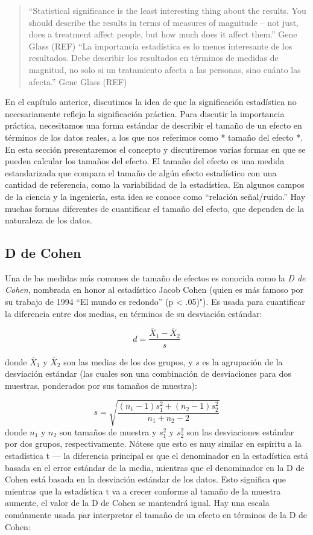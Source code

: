 \documentclass[
  12pt,
]{book}
\theoremstyle{definition}
\theoremstyle{definition}
\theoremstyle{definition}
\theoremstyle{remark}
\begin{document}
\begin{quote}
``Statistical significance is the least interesting thing about the results. You should describe the results in terms of measures of magnitude -- not just, does a treatment affect people, but how much does it affect them.'' Gene Glass (REF)
``La importancia estadística es lo menos interesante de los resultados. Debe describir los resultados en términos de medidas de magnitud, no solo si un tratamiento afecta a las personas, sino cuánto las afecta.'' Gene Glass (REF)
\end{quote}

En el capítulo anterior, discutimos la idea de que la significación estadística no necesariamente refleja la significación práctica. Para discutir la importancia práctica, necesitamos una forma estándar de describir el tamaño de un efecto en términos de los datos reales, a los que nos referimos como * tamaño del efecto *. En esta sección presentaremos el concepto y discutiremos varias formas en que se pueden calcular los tamaños del efecto.
El tamaño del efecto es una medida estandarizada que compara el tamaño de algún efecto estadístico con una cantidad de referencia, como la variabilidad de la estadística. En algunos campos de la ciencia y la ingeniería, esta idea se conoce como ``relación señal/ruido.'' Hay muchas formas diferentes de cuantificar el tamaño del efecto, que dependen de la naturaleza de los datos.

\hypertarget{d-de-cohen}{%
\subsection{D de Cohen}\label{d-de-cohen}}

Una de las medidas más comunes de tamaño de efectos es conocida como la \emph{D de Cohen}, nombrada en honor al estadístico Jacob Cohen (quien es más famoso por su trabajo de 1994 ``El mundo es redondo'' (p \textless{} .05)"). Es usada para cuantificar la diferencia entre dos medias, en términos de su desviación estándar:

\[
d = \frac{\bar{X}_1 - \bar{X}_2}{s}
\]

donde \(\bar{X}_1\) y \(\bar{X}_2\) son las medias de los dos grupos, y \(s\) es la agrupación de la desviación estándar (las cuales son una combinación de desviaciones para dos muestras, ponderados por sus tamaños de muestra):

\[
s = \sqrt{\frac{(n_1 - 1)s^2_1 + (n_2 - 1)s^2_2 }{n_1 +n_2 -2}}
\]
donde \(n_1\) y \(n_2\) son tamaños de muestra y \(s^2_1\) y \(s^2_2\) son las desviaciones estándar por dos grupos, respectivamente. Nótese que esto es muy similar en espíritu a la estadística t --- la diferencia principal es que el denominador en la estadística está basada en el error estándar de la media, mientras que el denominador en la D de Cohen está basada en la desviación estándar de los datos. Esto significa que mientras que la estadística t va a crecer conforme al tamaño de la muestra aumente, el valor de la D de Cohen se mantendrá igual.
Hay una escala comúnmente usada par interpretar el tamaño de un efecto en términos de la D de Cohen:
\end{document}
